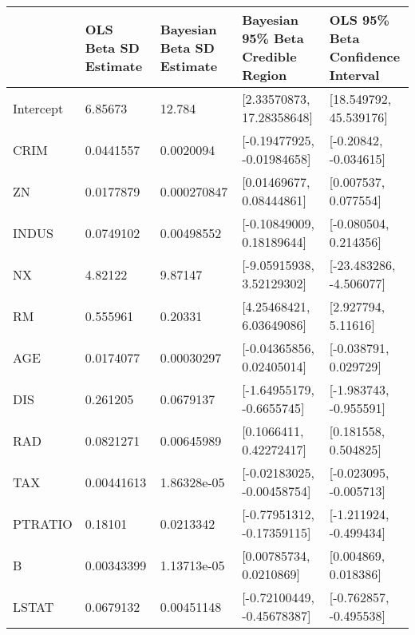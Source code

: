 \begin{tabular}{lllll}
\hline
           & OLS Beta SD Estimate   & Bayesian Beta SD Estimate   & Bayesian 95\% Beta Credible Region   & OLS 95\% Beta Confidence Interval   \\
\hline
 Intercept & 6.85673                & 12.784                      & [2.33570873, 17.28358648]           & [18.549792, 45.539176]             \\
 CRIM      & 0.0441557              & 0.0020094                   & [-0.19477925, -0.01984658]          & [-0.20842, -0.034615]              \\
 ZN        & 0.0177879              & 0.000270847                 & [0.01469677, 0.08444861]            & [0.007537, 0.077554]               \\
 INDUS     & 0.0749102              & 0.00498552                  & [-0.10849009, 0.18189644]           & [-0.080504, 0.214356]              \\
 NX        & 4.82122                & 9.87147                     & [-9.05915938, 3.52129302]           & [-23.483286, -4.506077]            \\
 RM        & 0.555961               & 0.20331                     & [4.25468421, 6.03649086]            & [2.927794, 5.11616]                \\
 AGE       & 0.0174077              & 0.00030297                  & [-0.04365856, 0.02405014]           & [-0.038791, 0.029729]              \\
 DIS       & 0.261205               & 0.0679137                   & [-1.64955179, -0.6655745]           & [-1.983743, -0.955591]             \\
 RAD       & 0.0821271              & 0.00645989                  & [0.1066411, 0.42272417]             & [0.181558, 0.504825]               \\
 TAX       & 0.00441613             & 1.86328e-05                 & [-0.02183025, -0.00458754]          & [-0.023095, -0.005713]             \\
 PTRATIO   & 0.18101                & 0.0213342                   & [-0.77951312, -0.17359115]          & [-1.211924, -0.499434]             \\
 B         & 0.00343399             & 1.13713e-05                 & [0.00785734, 0.0210869]             & [0.004869, 0.018386]               \\
 LSTAT     & 0.0679132              & 0.00451148                  & [-0.72100449, -0.45678387]          & [-0.762857, -0.495538]             \\
\hline
\end{tabular}
